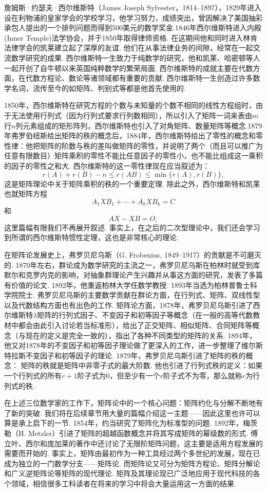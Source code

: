 詹姆斯·约瑟夫·西尔维斯特（James Joseph Sylvester，1814--1897），1829年进入设在利物浦的皇家学会的学校学习，他学习努力，成绩突出，曾因解决了美国抽彩承包人提出的一个排列问题而得到500美元的数学奖金.1846年西尔维斯特进入内殿(Inner Temple)法学协会，并于1850年取得律师资格. 在这期间他和同时进入林肯法律学会的凯莱建立起了深厚的友谊. 他们在从事法律业务的间隙，经常在一起交流数学研究的成果. 西尔维斯特一生致力于纯数学的研究，他和凯莱、哈密顿等人一起开创了自牛顿以来英国纯粹数学的繁荣局面. 西尔维斯特的成就主要在代数方面，在代数方程论、数论等诸领域都有重要的贡献. 西尔维斯特一生创造过许多数学名词，流传至今的如矩阵、判别式等都是他首先使用的.

1850年，西尔维斯特在研究方程的个数与未知量的个数不相同的线性方程组时，由于无法使用行列式（因为行列式要求行列数相同），所以引入了矩阵一词来表由$m$行$n$列元素组成的矩形阵列，西尔维斯特也引入了对角矩阵、数量矩阵等概念.1879年弗罗伯纽斯给出矩阵的秩的概念后，1884年，西尔维斯特给出了零性的概念和零性律：他把矩阵的阶数与秩的差叫做矩阵的零性，并说明了两个（而且可以推广为任意有限数目）矩阵乘积的零性不能比任意因子的零性小，也不能比组成这一乘积的因子的零性之和大. 西尔维斯特的这一零性律现在应当叙述为：
\[r(A)+r(B)-n\leqslant r(AB)\leqslant\min\{r(A),r(B)\},\]
这是矩阵理论中关于矩阵乘积的秩的一个重要定理. 除此之外，西尔维斯特和凯莱也就矩阵方程
\[A_1XB_1+\cdots+A_kXB_k=C\]
和
\[AX-XB=O,\]
这里篇幅有限我们不再展开叙述. 事实上，在之后的二次型理论中，我们还会学习到所谓的西尔维斯特惯性定理，这也是非常核心的理论.

在矩阵论发展史上，弗罗贝尼乌斯（G. Frobenius, 1849--1917）的贡献是不可磨灭的. 1870年左右，群论成为数学研究的主流之一，弗罗贝尼乌斯在柏林时就受到库默尔和克罗内克的影响，对抽象群理论产生兴趣并从事这方面的研究，发表了多篇有价值的论文. 1892年，他重返柏林大学任数学教授. 1893年当选为柏林普鲁士科学院院士. 弗罗贝尼乌斯的主要数学贡献在群论方面，在行列式、矩阵、双线性型以及代数结构方面也有出色的工作. 矩阵论方面，1878年，弗罗贝尼乌斯引进了西尔维斯特$\lambda$矩阵的行列式因子、不变因子和初等因子等概念（在一般的高等代数教材中都会由此引入讨论若当标准形），给出了正交矩阵、相似矩阵、合同矩阵等概念（与现在的定义是完全一致的），指出了各种不同类型的矩阵的关系. 1894年，他又对1878年的不变因子和初等因子理论做了更深入的工作，进一步整理了维尔斯特拉斯不变因子和初等因子的理论. 1879年，弗罗贝尼乌斯引进了矩阵的秩的概念： 矩阵的秩就是矩阵中非零子式的最大阶数. 他也引进了行列式秩的定义：如果一个行列式的所有$r+1$阶子式为0，但至少有一个$r$阶子式不为零，那么就称$r$为行列式的秩.

在上述三位数学家的工作下，矩阵论中的一个核心问题：矩阵约化与分解不断地有了新的突破. 我们将在后续章节用大量的篇幅介绍这一主题——因此这里也许可以算是承上启下的一节. 1854年，约当研究了矩阵化为标准型的问题. 1892年，梅茨勒（H. Metzler）引进了矩阵的超越函数概念并将其写成矩阵的幂级数的形式. 傅立叶、西尔和庞加莱的著作中还讨论了无限阶矩阵问题，这主要是适用方程发展的需要而开始的. 事实上，矩阵由最初作为一种工具经过两个多世纪的发展，现在已成为独立的一门数学分支——矩阵论. 而矩阵论又可分为矩阵方程论、矩阵分解论和广义逆矩阵论等矩阵的现代理论. 矩阵及其理论现已广泛地应用于现代科技的各个领域，相信很多工科读者在将来的学习中将会大量运用这一方面的结果.

